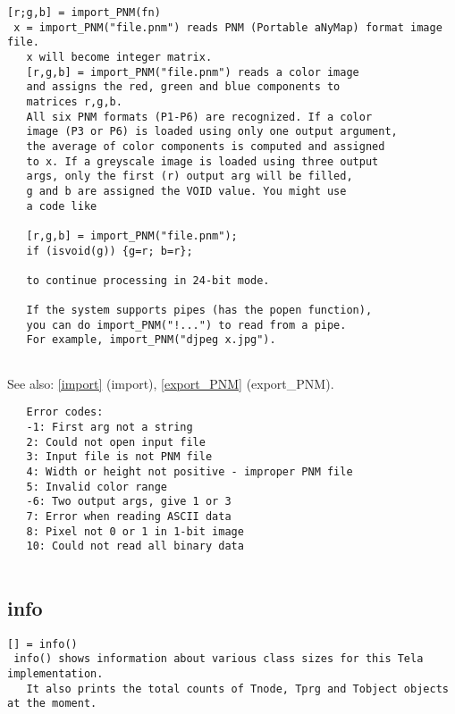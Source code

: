 \documentclass[a4paper]{article}
\begin{document}
\begin{tscreen}
\begin{verbatim}
[r;g,b] = import_PNM(fn)
 x = import_PNM("file.pnm") reads PNM (Portable aNyMap) format image file.
   x will become integer matrix.
   [r,g,b] = import_PNM("file.pnm") reads a color image
   and assigns the red, green and blue components to
   matrices r,g,b.
   All six PNM formats (P1-P6) are recognized. If a color
   image (P3 or P6) is loaded using only one output argument,
   the average of color components is computed and assigned
   to x. If a greyscale image is loaded using three output
   args, only the first (r) output arg will be filled,
   g and b are assigned the VOID value. You might use
   a code like

   [r,g,b] = import_PNM("file.pnm");
   if (isvoid(g)) {g=r; b=r};

   to continue processing in 24-bit mode.

   If the system supports pipes (has the popen function),
   you can do import_PNM("!...") to read from a pipe.
   For example, import_PNM("djpeg x.jpg").
   
\end{verbatim}

See also: \ref{import} {(import)}, \ref{export_PNM} {(export\_PNM)}.
\begin{verbatim}
   Error codes:
   -1: First arg not a string
   2: Could not open input file
   3: Input file is not PNM file
   4: Width or height not positive - improper PNM file
   5: Invalid color range
   -6: Two output args, give 1 or 3
   7: Error when reading ASCII data
   8: Pixel not 0 or 1 in 1-bit image
   10: Could not read all binary data
   
\end{verbatim}
\end{tscreen}





\subsection{info\label{info}}

\begin{tscreen}
\begin{verbatim}
[] = info()
 info() shows information about various class sizes for this Tela implementation.
   It also prints the total counts of Tnode, Tprg and Tobject objects at the moment. 
\end{verbatim}
\end{tscreen}
\end{document}

